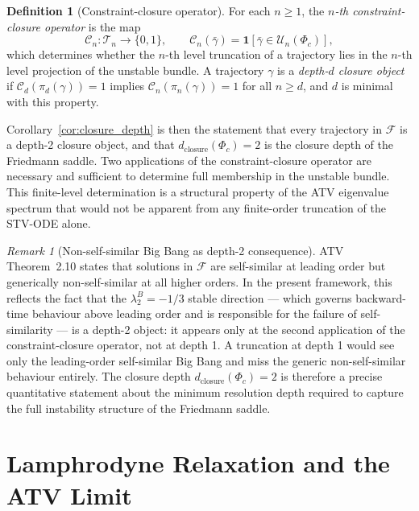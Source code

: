 \documentclass[12pt,a4paper]{article}
\theoremstyle{plain}
\theoremstyle{definition}
\newtheorem{definition}[theorem]{Definition}
\theoremstyle{remark}
\newtheorem{remark}[theorem]{Remark}
\newcommand{\Phic}{\Phi_c}
\newcommand{\Tacc}{\mathcal{T}}
\newcommand{\Uacc}{\mathcal{U}}
\newcommand{\piproj}{\pi}
\newcommand{\Ffam}{\mathcal{F}}
\newcommand{\dclos}{d_{\mathrm{closure}}}
\newcommand{\lBn}[1]{\lambda^B_{#1}}
\begin{document}
\begin{definition}[Constraint-closure operator]
\label{def:closure_op}
For each $n\geq 1$, the \emph{$n$-th constraint-closure operator} is the map
\begin{equation}
  \mathcal{C}_n : \Tacc_n \to \{0,1\},
  \qquad
  \mathcal{C}_n(\bar\gamma) = \mathbf{1}[\bar\gamma \in \Uacc_n(\Phic)],
  \label{eq:closure_op}
\end{equation}
which determines whether the $n$-th level truncation of a trajectory lies in
the $n$-th level projection of the unstable bundle. A trajectory $\gamma$ is
a \emph{depth-$d$ closure object} if $\mathcal{C}_d(\piproj_d(\gamma)) = 1$
implies $\mathcal{C}_n(\piproj_n(\gamma)) = 1$ for all $n\geq d$, and $d$
is minimal with this property.
\end{definition}

Corollary~\ref{cor:closure_depth} is then the statement that every trajectory
in $\Ffam$ is a depth-2 closure object, and that $\dclos(\Phic) = 2$ is the
closure depth of the Friedmann saddle. Two applications of the constraint-closure
operator are necessary and sufficient to determine full membership in the unstable
bundle. This finite-level determination is a structural property of the ATV
eigenvalue spectrum that would not be apparent from any finite-order truncation
of the STV-ODE alone.

\begin{remark}[Non-self-similar Big Bang as depth-2 consequence]
ATV Theorem~2.10 states that solutions in $\Ffam$ are self-similar at leading
order but generically non-self-similar at all higher orders. In the present
framework, this reflects the fact that the $\lBn{2} = -1/3$ stable direction
--- which governs backward-time behaviour above leading order and is responsible
for the failure of self-similarity --- is a depth-2 object: it appears only at
the second application of the constraint-closure operator, not at depth 1.
A truncation at depth 1 would see only the leading-order self-similar Big Bang
and miss the generic non-self-similar behaviour entirely. The closure depth
$\dclos(\Phic) = 2$ is therefore a precise quantitative statement about the
minimum resolution depth required to capture the full instability structure
of the Friedmann saddle.
\end{remark}

\section{Lamphrodyne Relaxation and the ATV Limit}
\label{sec:lamp_limit}
\end{document}
